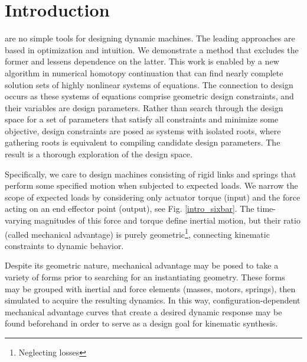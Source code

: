 \documentclass[journal]{IEEEtran}
\begin{document}
\IEEEpeerreviewmaketitle


\section{Introduction}
\label{sec:intro}
% 
% 
% 
% 
 are no simple tools for designing dynamic machines.
The leading approaches are based in optimization and intuition.
We demonstrate a method that excludes the former and lessens dependence on the latter.
This work is enabled by a new algorithm in numerical homotopy continuation that can find nearly complete solution sets of highly nonlinear systems of equations.
%
The connection to design occurs as these systems of equations comprise geometric design constraints, and their variables are design parameters.
Rather than search through the design space for a set of parameters that satisfy all constraints and minimize some objective, design constraints are posed as systems with isolated roots, where gathering roots is equivalent to compiling candidate design parameters.  The result is a thorough exploration of the design space.


Specifically, we care to design machines consisting of rigid links and springs that perform some specified motion when subjected to expected loads.
We narrow the scope of expected loads by considering only actuator torque (input) and the force acting on an end effector point (output), see Fig. \ref{intro_sixbar}.
The time-varying magnitudes of this force and torque define inertial motion, but their ratio (called mechanical advantage) is purely geometric\footnote{Neglecting losses}, connecting kinematic constraints to dynamic behavior.

Despite its geometric nature, mechanical advantage may be posed to take a variety of forms prior to searching for an instantiating geometry.
These forms may be grouped with inertial and force elements (masses, motors, springs), then simulated to acquire the resulting dynamics.
In this way, configuration-dependent mechanical advantage curves that create a desired dynamic response may be found beforehand in order to serve as a design goal for kinematic synthesis.
\end{document}

